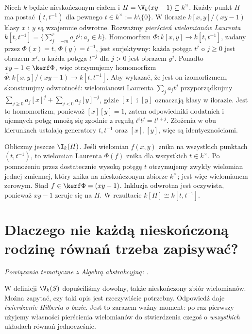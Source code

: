\begin{przyklad}
Niech $k$ będzie nieskończonym ciałem i
$H=\V_k(xy-1)\subseteq k^2$. Każdy punkt $H$ ma postać
$(t,t^{-1})$ dla pewnego $t\in k^\times:=k\setminus\{0\}$.
W ilorazie $k[x,y]/(xy-1)$ klasy $x$ i $y$ są wzajemnie
odwrotne. Rozważmy \emph{pierścień wielomianów Laurenta}
$k[t,t^{-1}]=\{\sum_{j=-m}^r a_jt^j:a_j\in k\}$.
Homomorfizm $\Phi:k[x,y]\to k[t,t^{-1}]$, zadany przez
$\Phi(x)=t$, $\Phi(y)=t^{-1}$, jest surjektywny:
każda potęga $t^j$ o $j\ge0$ jest obrazem $x^j$, a każda
potęga $t^{-j}$ dla $j>0$ jest obrazem $y^j$.
Ponadto $xy-1\in\kerf\Phi$, więc otrzymujemy homomorfizm
$\overline\Phi:k[x,y]/(xy-1)\to k[t,t^{-1}]$.
Aby wykazać, że jest on izomorfizmem, skonstruujmy odwrotność:
wielomianowi Laurenta $\sum_j a_jt^j$ przyporządkujmy
$\sum_{j\ge0}a_j[x]^j+\sum_{j<0}a_j[y]^{-j}$,
gdzie $[x]$ i $[y]$ oznaczają klasy w ilorazie.
Jest to homomorfizm, ponieważ $[x][y]=1$, zatem
odpowiedniki dodatnich i ujemnych potęg mnożą się zgodnie
z regułą $t^it^j=t^{i+j}$. Złożenia w obu kierunkach
ustalają generatory $t,t^{-1}$ oraz $[x],[y]$, więc są identycznościami.

Obliczmy jeszcze $\I_k(H)$. Jeśli wielomian $f(x,y)$ znika na
wszystkich punktach $(t,t^{-1})$, to wielomian Laurenta
$\Phi(f)$ znika dla wszystkich $t\in k^\times$.
Po pomnożeniu przez dostatecznie wysoką potęgę $t$
otrzymujemy zwykły wielomian jednej zmiennej, który znika
na nieskończonym zbiorze $k^\times$; jest więc wielomianem zerowym.
Stąd $f\in\kerf\Phi=(xy-1)$. Inkluzja odwrotna jest
oczywista, ponieważ $xy-1$ zeruje się na $H$. W rezultacie
$k[H]\cong k[t,t^{-1}]$.
\end{przyklad}

\section{Dlaczego nie każdą nieskończoną rodzinę równań trzeba zapisywać?}

\noindent\emph{Powiązania tematyczne z Algebrą abstrakcyjną:} .


W definicji $\V_k(S)$ dopuściliśmy dowolny, także nieskończony
zbiór wielomianów. Można zapytać, czy taki opis jest rzeczywiście
potrzebny. Odpowiedź daje \emph{twierdzenie Hilberta o bazie}.
Jest to zarazem ważny moment: po raz pierwszy użyjemy własności
pierścienia wielomianów do stwierdzenia czegoś o \emph{wszystkich}
układach równań jednocześnie.

